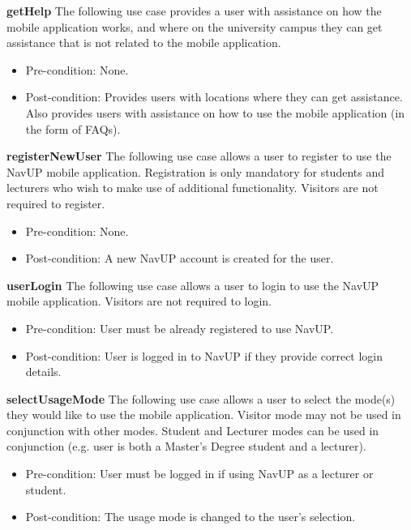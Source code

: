 \documentclass[12pt,a4paper]{article}
\begin{document}
	    \medskip
	    
	    \textbf{getHelp}
		The following use case provides a user with assistance on how the mobile application works, and where on the 				    university campus they can get assistance that is not related to the mobile application.
			
		\begin{itemize}
		  \item Pre-condition: None.
		   \item Post-condition: Provides users with locations where they can get assistance. Also provides users with 		  		             assistance on how to use the mobile application (in the form of FAQs).
		\end{itemize}
		
		\textbf{registerNewUser}
		The following use case allows a user to register to use the NavUP mobile application. Registration is only mandatory 			for students and lecturers who wish to make use of additional functionality. Visitors are not required to register.
			
		\begin{itemize}
		  \item Pre-condition: None.
		   \item Post-condition: A new NavUP account is created for the user. 
		\end{itemize}
		
		\textbf{userLogin}
			The following use case allows a user to login to use the NavUP mobile application. Visitors are not required to 				login.
			
		\begin{itemize}
		  \item Pre-condition: User must be already registered to use NavUP.
		   \item Post-condition: User is logged in to NavUP if they provide correct login details.
		\end{itemize}
		
	    \textbf{selectUsageMode}
	    The following use case allows a user to select the mode(s) they would like to use the mobile application. Visitor mode    		may not be used in conjunction with other modes. Student and Lecturer modes can be used in conjunction (e.g. user is 			both a Master's Degree student and a lecturer).
			
		\begin{itemize}
		  \item Pre-condition: User must be logged in if using NavUP as a lecturer or student.
		   \item Post-condition: The usage mode is changed to the user's selection.
		\end{itemize}
		
\end{document}
